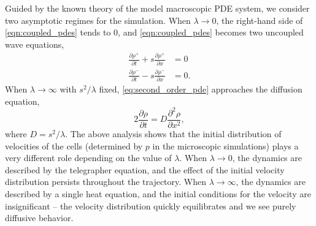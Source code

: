 \documentclass[3p]{elsarticle}
\begin{document}
Guided by the known theory of the model macroscopic PDE system, we consider two asymptotic regimes for the simulation.
%
When $\lambda \rightarrow 0$, the right-hand side of \eqref{eqn:coupled_pdes} tends to 0, and \eqref{eqn:coupled_pdes} becomes two uncoupled wave equations,
\begin{equation}
\begin{aligned}
\frac{\partial \rho^+}{\partial t} + s \frac{\partial \rho^+}{\partial x} & = 0 \\
\frac{\partial \rho^-}{\partial t} - s \frac{\partial \rho^-}{\partial x} & = 0.
\end{aligned}
\end{equation}
%
When $\lambda \rightarrow \infty$ with $s^2/\lambda$ fixed, \eqref{eq:second_order_pde} approaches the diffusion equation,
\begin{equation} \label{eq:diff_eqn}
2 \frac{\partial \rho}{\partial t} = D \frac{\partial ^2 \rho}{\partial x^2},
\end{equation}
%
where $D=s^2/\lambda$.
%
The above analysis shows that the initial distribution of velocities of the cells 
(determined by $p$ in the microscopic simulations) plays a very different role depending on the value of $\lambda$.
%
When $\lambda \rightarrow 0$, the dynamics are described by the telegrapher equation, and the effect of the initial velocity distribution 
persists throughout the trajectory.
%
When $\lambda \rightarrow \infty$, the dynamics are described by a single heat equation, and the initial conditions 
for the velocity are insignificant -- the velocity distribution quickly equilibrates and we see purely diffusive behavior.
\end{document}
